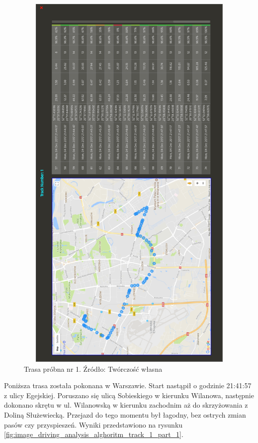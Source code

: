 \begin{figure}[H]
	\centering
	\includegraphics[height=19cm, width=13cm]{img/driving_analysis/test_track_1.png}
	\caption{Trasa próbna nr 1. Źródło: Twórczość własna}
	\label{fig:image_driving_analysis_alghoritm_track_1}
\end{figure}


Poniższa trasa została pokonana w Warszawie. Start nastąpił o godzinie 21:41:57 z ulicy Egejskiej. Poruszano się ulicą Sobieskiego w kierunku Wilanowa, następnie dokonano skrętu w ul. Wilanowską w kierunku zachodnim aż do skrzyżowania z Doliną Służewiecką. Przejazd do tego momentu był łagodny, bez ostrych zmian pasów czy przyspieszeń. Wyniki przedstawiono na rysunku \ref{fig:image_driving_analysis_alghoritm_track_1_part_1}.

